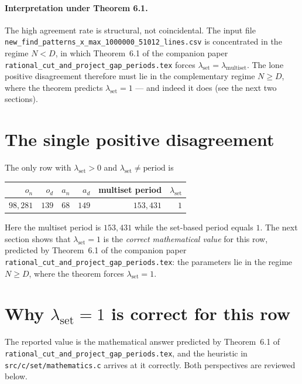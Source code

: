 \documentclass[11pt]{article}
\begin{document}
\paragraph{Interpretation under Theorem 6.1.}
The high agreement rate is structural, not coincidental. The input file
\texttt{new\_find\_patterns\_x\_max\_1000000\_51012\_lines.csv} is
concentrated in the regime $N < D$, in which Theorem~6.1 of the
companion paper
\texttt{rational\_cut\_and\_project\_gap\_periods.tex} forces
$\lambda_{\text{set}} = \lambda_{\text{multiset}}$.  The lone positive
disagreement therefore must lie in the complementary regime $N \ge D$,
where the theorem predicts $\lambda_{\text{set}} = 1$ — and indeed it
does (see the next two sections).

\section*{The single positive disagreement}

The only row with $\lambda_{\text{set}} > 0$ and
$\lambda_{\text{set}} \neq \mathrm{period}$ is

\begin{center}
\begin{tabular}{rrrrrr}
\toprule
$o_n$ & $o_d$ & $a_n$ & $a_d$ & multiset period & $\lambda_{\text{set}}$ \\
\midrule
$98{,}281$ & $139$ & $68$ & $149$ & $153{,}431$ & $1$ \\
\bottomrule
\end{tabular}
\end{center}

Here the multiset period is $153{,}431$ while the set-based period
equals $1$. The next section shows that $\lambda_{\text{set}} = 1$ is
the \emph{correct mathematical value} for this row, predicted by
Theorem~6.1 of the companion paper
\texttt{rational\_cut\_and\_project\_gap\_periods.tex}: the parameters
lie in the regime $N \ge D$, where the theorem forces
$\lambda_{\text{set}} = 1$.

\section*{Why $\lambda_{\text{set}} = 1$ is correct for this row}

The reported value is the mathematical answer predicted by
Theorem~6.1 of
\texttt{rational\_cut\_and\_project\_gap\_periods.tex}, and the
heuristic in \texttt{src/c/set/mathematics.c} arrives at it correctly.
Both perspectives are reviewed below.
\end{document}

